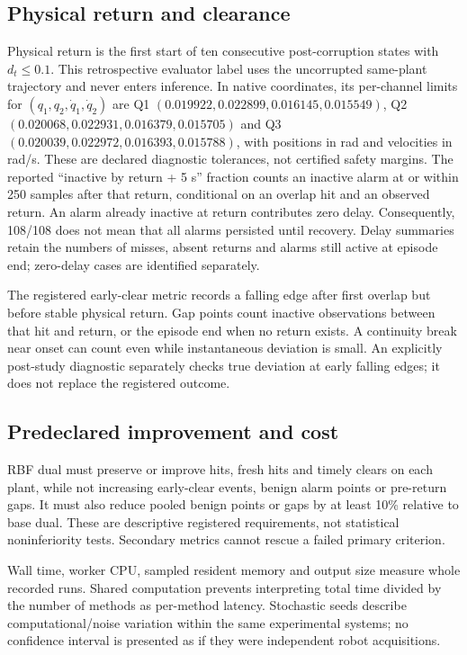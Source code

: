 \subsection{Physical return and clearance}
Physical return is the first start of ten consecutive post-corruption states with $d_t\le0.1$. This retrospective evaluator label uses the uncorrupted same-plant trajectory and never enters inference. In native coordinates, its per-channel limits for $(q_1,q_2,\dot q_1,\dot q_2)$ are Q1 $(0.019922,0.022899,0.016145,0.015549)$, Q2 $(0.020068,0.022931,0.016379,0.015705)$ and Q3 $(0.020039,0.022972,0.016393,0.015788)$, with positions in rad and velocities in rad/s. These are declared diagnostic tolerances, not certified safety margins. The reported ``inactive by return + 5 s'' fraction counts an inactive alarm at or within 250 samples after that return, conditional on an overlap hit and an observed return. An alarm already inactive at return contributes zero delay. Consequently, 108/108 does not mean that all alarms persisted until recovery. Delay summaries retain the numbers of misses, absent returns and alarms still active at episode end; zero-delay cases are identified separately.

The registered early-clear metric records a falling edge after first overlap but before stable physical return. Gap points count inactive observations between that hit and return, or the episode end when no return exists. A continuity break near onset can count even while instantaneous deviation is small. An explicitly post-study diagnostic separately checks true deviation at early falling edges; it does not replace the registered outcome.

\subsection{Predeclared improvement and cost}
RBF dual must preserve or improve hits, fresh hits and timely clears on each plant, while not increasing early-clear events, benign alarm points or pre-return gaps. It must also reduce pooled benign points or gaps by at least 10\% relative to base dual. These are descriptive registered requirements, not statistical noninferiority tests. Secondary metrics cannot rescue a failed primary criterion.

Wall time, worker CPU, sampled resident memory and output size measure whole recorded runs. Shared computation prevents interpreting total time divided by the number of methods as per-method latency. Stochastic seeds describe computational/noise variation within the same experimental systems; no confidence interval is presented as if they were independent robot acquisitions.
